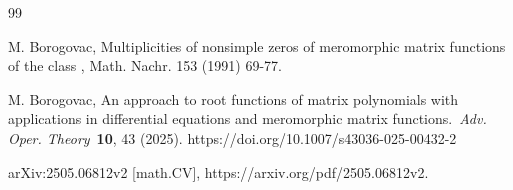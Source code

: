\documentclass[11pt, reqno]{amsart}
\makeatletter
\theoremstyle{plain}
\theoremstyle{remark}
\numberwithin{equation}{section}
\newcounter{mathrecordid}
\newcommand{\mathboxbegin}[1]{%
  \stepcounter{mathrecordid}%
  \immediate\write\mathrecords{\themathrecordid,#1}%
  \special{pdf:bann << /Type /Annot /Subtype /Link /Border [0 0 0]
    /MathBoxID \themathrecordid /F 2
    /A << /S /URI /URI (urn:mathbox:\themathrecordid) >> >>}}
\newcommand{\mathboxinlineplain}[1]{$#1$}
\newcommand{\mathboxinline}[1]{%
  $\mathboxbegin{inline}%
  \special{pdf:literal direct /MathBoxBegin\themathrecordid\space MP}%
  #1\special{pdf:literal direct /MathBoxEnd\themathrecordid\space MP}%
  \special{pdf:eann}$}
\newcommand{\recordmath}{%
  \ifmeasuring@\expandafter\mathboxinlineplain
  \else\expandafter\mathboxinline\fi}
\makeatother
\begin{document}
\begin{thebibliography}{99}







 M. Borogovac, Multiplicities of nonsimple zeros of meromorphic matrix functions of the class \recordmath{N_{\kappa}^{n\times n}}, Math. Nachr. 153 (1991) 69-77.



 M. Borogovac, An approach to root functions of matrix polynomials with applications in differential equations and meromorphic matrix functions.~\textit{Adv. Oper. Theory}~\textbf{10}, 43 (2025). https://doi.org/10.1007/s43036-025-00432-2

arXiv:2505.06812v2 [math.CV], https://arxiv.org/pdf/2505.06812v2.


\end{thebibliography}
\end{document}
